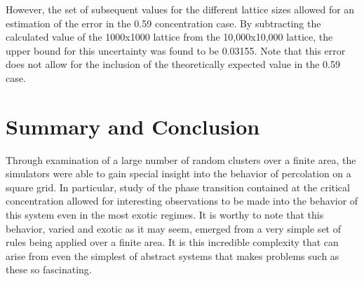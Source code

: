 \documentclass[twocolumn,prb,amsmath,amssymb,amsfonts]{revtex4}
\begin{document}
However, the set of subsequent values for the different lattice sizes allowed for an estimation of the error in the 0.59 concentration case. By subtracting the calculated value of the 1000x1000 lattice from the 10,000x10,000 lattice, the upper bound for this uncertainty was found to be 0.03155. Note that this error does not allow for the inclusion of the theoretically expected value in the 0.59 case. 

\section{Summary and Conclusion}
Through examination of a large number of random clusters over a finite area, the simulators were able to gain special insight into the behavior of percolation on a square grid. In particular, study of the phase transition contained at the critical concentration allowed for interesting observations to be made into the behavior of this system even in the most exotic regimes. It is worthy to note that this behavior, varied and exotic as it may seem, emerged from a very simple set of rules being applied over a finite area. It is this incredible complexity that can arise from even the simplest of abstract systems that makes problems such as these so fascinating.
\end{document}
